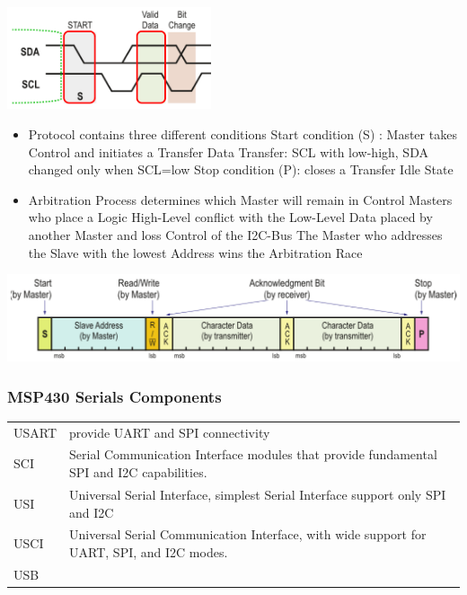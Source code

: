 \includegraphics[width=6cm]{images/i2c_2.png}\\
\begin{minipage}{\linewidth}
	\begin{itemize}
		\item Protocol contains three different conditions
		\subitem Start condition (S) : Master takes Control and initiates a Transfer
		\subitem Data Transfer: SCL with low-high, SDA changed only when SCL=low
		\subitem Stop condition (P): closes a Transfer
		\subitem Idle State
		\item Arbitration Process determines which Master will remain in Control
		\subitem Masters who place a Logic High-Level conflict with the Low-Level Data placed by another Master and loss Control of the I2C-Bus
		\subitem The Master who addresses the Slave with the lowest Address wins the Arbitration Race
	\end{itemize}
\end{minipage}
\includegraphics[width=16cm]{images/i2c_data.png}\\
\subsubsection{MSP430 Serials Components}
\begin{tabular}{ll}
    USART &
    provide UART and SPI connectivity\\
    
    SCI &
	Serial Communication Interface modules that provide fundamental SPI and I2C capabilities.\\
    
	USI &
	Universal Serial Interface, simplest Serial Interface support only SPI and I2C\\
    
	USCI &
	Universal Serial Communication Interface, with wide support for UART, SPI, and I2C modes.\\
    
	USB & \\
    
\end{tabular}
\clearpage
\pagebreak
